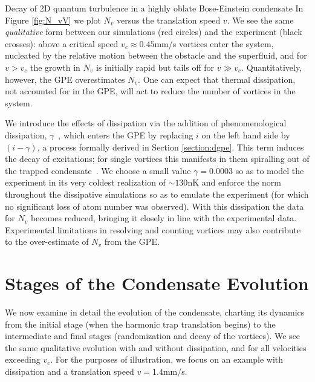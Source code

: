 \begin{chapter}{\label{cha:shin}Decay of 2D quantum turbulence in a highly oblate Bose-Einstein condensate}
In Figure \ref{fig:N_vV} we plot $N_v$ versus the translation speed $v$.  We see the same {\it qualitative} form between our simulations (red circles) and the experiment (black crosses): above a critical speed $v_c \approx 0.45$mm/s vortices enter the system, nucleated by the relative motion between the obstacle and the superfluid, and for $v>v_c$ the growth in $N_v$ is initially rapid but tails off for $v\gg v_c$. Quantitatively, however, the GPE overestimates $N_v$.   One can expect that thermal dissipation, not accounted for in the GPE, will act to reduce the number of vortices in the system.

We introduce the effects of dissipation via the addition of phenomenological dissipation, $\gamma$~\citep{choi_morgan_98,tsubota_kasamatsu_02}, which enters the GPE by replacing $i$ on the left hand side by $(i-\gamma)$, a process formally derived in Section \ref{section:dgpe}.  This term induces the decay of excitations; for single vortices this manifests in them spiralling out of the trapped condensate~\citep{madarassy_barenghi_08,jackson_proukakis_09,allen_zaremba_13,yan_proukakis_14}. We choose a small value $\gamma = 0.0003$ so as to model the experiment in its very coldest realization of $\sim130$nK and enforce the norm throughout the dissipative simulations so as to emulate the experiment (for which no significant loss of atom number was observed). With this dissipation the data for $N_v$ becomes reduced, bringing it closely in line with the experimental data. Experimental limitations in resolving and counting vortices may also contribute to the over-estimate of $N_v$ from the GPE.

\section{Stages of the Condensate Evolution}

We now examine in detail the evolution of the condensate, 
charting its dynamics from the initial stage (when the
harmonic trap translation begins) to the intermediate and final stages 
(randomization and decay of the vortices).  We see the same 
qualitative evolution with and without dissipation, and for all 
velocities exceeding $v_c$.  For the purposes of illustration, 
we focus on an example with dissipation and a translation 
speed $v=1.4$mm/s. 


\end{chapter}
